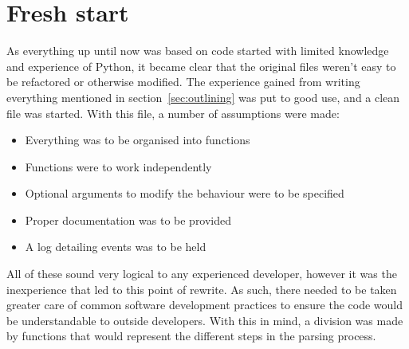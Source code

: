 \documentclass[11pt,british]{article}
\begin{document}
\section{Fresh start}
As everything up until now was based on code started with limited knowledge and experience of Python, it became clear that the original files weren't easy to be refactored or otherwise modified. The experience gained from writing everything mentioned in section~\ref{sec:outlining} was put to good use, and a clean file was started. With this file, a number of assumptions were made:
\begin{itemize}
\item Everything was to be organised into functions
\item Functions were to work independently
\item Optional arguments to modify the behaviour were to be specified
\item Proper documentation was to be provided
\item A log detailing events was to be held
\end{itemize}
All of these sound very logical to any experienced developer, however it was the inexperience that led to this point of rewrite. As such, there needed to be taken greater care of common software development practices to ensure the code would be understandable to outside developers. With this in mind, a division was made by functions that would represent the different steps in the parsing process.
\end{document}
